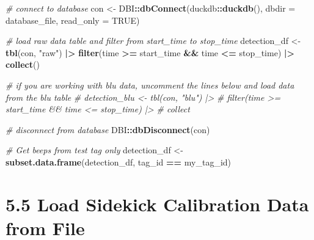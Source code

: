 \documentclass[
]{book}
\newenvironment{Shaded}{\begin{snugshade}}{\end{snugshade}}
\newcommand{\AttributeTok}[1]{\textcolor[rgb]{0.13,0.29,0.53}{#1}}
\newcommand{\CommentTok}[1]{\textcolor[rgb]{0.56,0.35,0.01}{\textit{#1}}}
\newcommand{\ConstantTok}[1]{\textcolor[rgb]{0.56,0.35,0.01}{#1}}
\newcommand{\FunctionTok}[1]{\textcolor[rgb]{0.13,0.29,0.53}{\textbf{#1}}}
\newcommand{\NormalTok}[1]{#1}
\newcommand{\OtherTok}[1]{\textcolor[rgb]{0.56,0.35,0.01}{#1}}
\newcommand{\SpecialCharTok}[1]{\textcolor[rgb]{0.81,0.36,0.00}{\textbf{#1}}}
\newcommand{\StringTok}[1]{\textcolor[rgb]{0.31,0.60,0.02}{#1}}
\begin{document}
\begin{Shaded}
\begin{Highlighting}[]
\CommentTok{\# connect to database}
\NormalTok{con }\OtherTok{\textless{}{-}}\NormalTok{ DBI}\SpecialCharTok{::}\FunctionTok{dbConnect}\NormalTok{(duckdb}\SpecialCharTok{::}\FunctionTok{duckdb}\NormalTok{(), }
                      \AttributeTok{dbdir =}\NormalTok{ database\_file, }
                      \AttributeTok{read\_only =} \ConstantTok{TRUE}\NormalTok{)}

\CommentTok{\# load raw data table and filter from start\_time to stop\_time}
\NormalTok{detection\_df }\OtherTok{\textless{}{-}} \FunctionTok{tbl}\NormalTok{(con, }\StringTok{"raw"}\NormalTok{) }\SpecialCharTok{|\textgreater{}} 
  \FunctionTok{filter}\NormalTok{(time }\SpecialCharTok{\textgreater{}=}\NormalTok{ start\_time }\SpecialCharTok{\&\&}\NormalTok{ time }\SpecialCharTok{\textless{}=}\NormalTok{ stop\_time) }\SpecialCharTok{|\textgreater{}}
  \FunctionTok{collect}\NormalTok{()}

\CommentTok{\# if you are working with blu data, uncomment the lines below and load data from the blu table}
\CommentTok{\# detection\_blu \textless{}{-} tbl(con, "blu") |\textgreater{}}
\CommentTok{\#   filter(time \textgreater{}= start\_time \&\& time \textless{}= stop\_time) |\textgreater{}}
\CommentTok{\#   collect}

\CommentTok{\# disconnect from database}
\NormalTok{DBI}\SpecialCharTok{::}\FunctionTok{dbDisconnect}\NormalTok{(con)}

\CommentTok{\# Get beeps from test tag only}
\NormalTok{detection\_df }\OtherTok{\textless{}{-}} \FunctionTok{subset.data.frame}\NormalTok{(detection\_df, }
\NormalTok{                                  tag\_id }\SpecialCharTok{==}\NormalTok{ my\_tag\_id)}
\end{Highlighting}
\end{Shaded}

\section{5.5 Load Sidekick Calibration Data from File}\label{load-sidekick-calibration-data-from-file}
\end{document}
